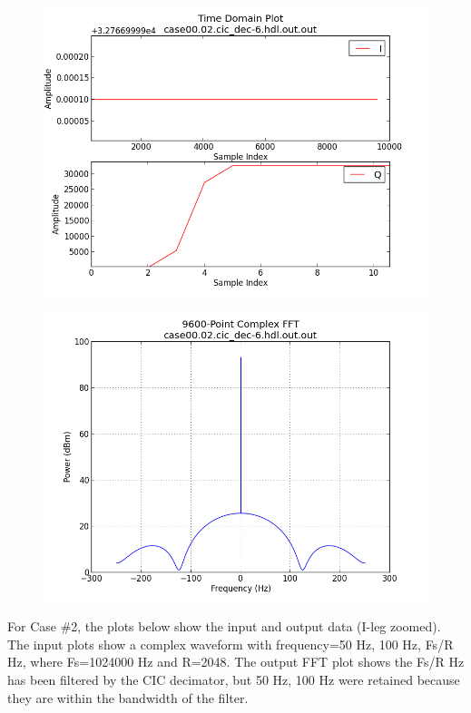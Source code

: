 \documentclass{article}
\begin{document}
	\begin{figure}[ht]
		\centering
		\begin{minipage}{.5\textwidth}
			\centering\includegraphics[width=1.0\linewidth]{output_time_DC}
			\label{fig:output_time_DC}
		\end{minipage}%
		\begin{minipage}{.5\textwidth}
			\centering\includegraphics[width=1.0\linewidth]{output_freq_DC}
			\label{fig:output_freq_DC}
		\end{minipage}
	\end{figure}

\newpage
	For Case \#2, the plots below show the input and output data (I-leg zoomed). The input plots show a complex waveform with frequency=50 Hz, 100 Hz, Fs\//R Hz, where Fs=1024000 Hz and R=2048. The output FFT plot shows the Fs\//R Hz has been filtered by the CIC decimator, but 50 Hz, 100 Hz were retained because they are within the bandwidth of the filter.
\end{document}
